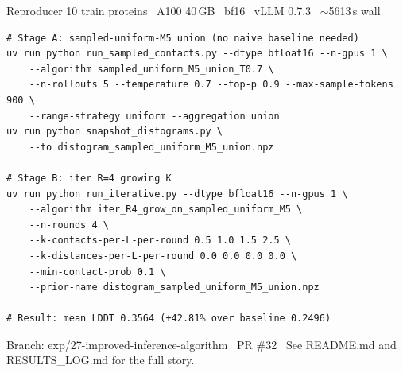 \documentclass[aspectratio=169,11pt]{beamer}
\begin{document}
\begin{frame}[fragile]{Reproducer}
  \scriptsize 10 train proteins \textperiodcentered\ A100 40\,GB \textperiodcentered\ bf16
  \textperiodcentered\ vLLM 0.7.3 \textperiodcentered\ $\sim$5613\,s wall
  \vspace{0.2em}
  \begin{lstlisting}[style=code,basicstyle=\ttfamily\scriptsize\color{navy}]
# Stage A: sampled-uniform-M5 union (no naive baseline needed)
uv run python run_sampled_contacts.py --dtype bfloat16 --n-gpus 1 \
    --algorithm sampled_uniform_M5_union_T0.7 \
    --n-rollouts 5 --temperature 0.7 --top-p 0.9 --max-sample-tokens 900 \
    --range-strategy uniform --aggregation union
uv run python snapshot_distograms.py \
    --to distogram_sampled_uniform_M5_union.npz

# Stage B: iter R=4 growing K
uv run python run_iterative.py --dtype bfloat16 --n-gpus 1 \
    --algorithm iter_R4_grow_on_sampled_uniform_M5 \
    --n-rounds 4 \
    --k-contacts-per-L-per-round 0.5 1.0 1.5 2.5 \
    --k-distances-per-L-per-round 0.0 0.0 0.0 0.0 \
    --min-contact-prob 0.1 \
    --prior-name distogram_sampled_uniform_M5_union.npz

# Result: mean LDDT 0.3564 (+42.81% over baseline 0.2496)
  \end{lstlisting}
  {\tiny\color{grey}\ttfamily Branch: exp/27-improved-inference-algorithm \textperiodcentered\
    PR \#32 \textperiodcentered\ See README.md and RESULTS\_LOG.md for the full story.}
\end{frame}
\end{document}
